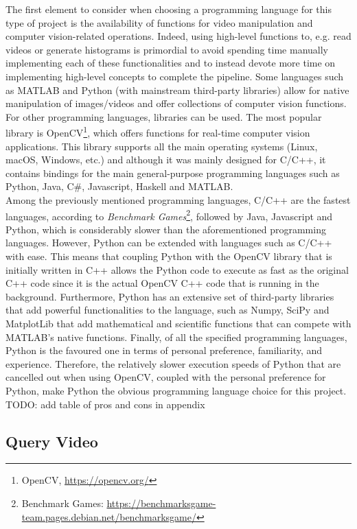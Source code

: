 The first element to consider when choosing a programming language for this type of project is the availability of functions for video manipulation and computer vision-related operations. Indeed, using high-level functions to, e.g. read videos or generate histograms is primordial to avoid spending time manually implementing each of these functionalities and to instead devote more time on implementing high-level concepts to complete the pipeline. Some languages such as MATLAB and Python (with mainstream third-party libraries) allow for native manipulation of images/videos and offer collections of computer vision functions. For other programming languages, libraries can be used. The most popular library is OpenCV\footnote{OpenCV, \url{https://opencv.org/}}, which offers functions for real-time computer vision applications. This library supports all the main operating systems (Linux, macOS, Windows, etc.) and although it was mainly designed for C/C++, it contains bindings for the main general-purpose programming languages such as Python, Java, C\#, Javascript, Haskell and MATLAB.\\

Among the previously mentioned programming languages, C/C++ are the fastest languages,
according to \textit{Benchmark Games}\footnote{Benchmark Games: \url{https://benchmarksgame-team.pages.debian.net/benchmarksgame/}}, followed by Java, Javascript and Python, which is considerably slower than the aforementioned programming languages. However, Python can be extended with languages such as C/C++ with ease. This means that coupling Python with the OpenCV library that is initially written in C++ allows the Python code to execute as fast as the original C++ code since it is the actual OpenCV C++ code that is running in the background. Furthermore, Python has an extensive set of third-party libraries that add powerful functionalities to the language, such as Numpy, SciPy and MatplotLib that add mathematical and scientific functions that can compete with MATLAB's native functions. Finally, of all the specified programming languages, Python is the favoured one in terms of personal preference, familiarity, and experience. Therefore, the relatively slower execution speeds of Python that are cancelled out when using OpenCV, coupled with the personal preference for Python, make Python the obvious programming language choice for this project.\\

TODO: add table of pros and cons in appendix

\subsection{Query Video}

